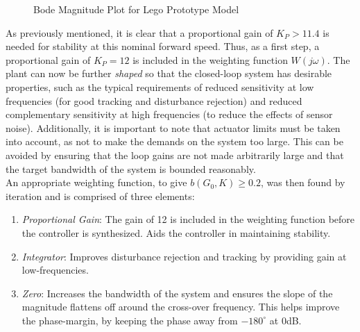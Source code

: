 \begin{figure}[H]
	\centering
	\caption{Bode Magnitude Plot for Lego Prototype Model}
	\label{fig:bodeLego}
\end{figure}

As previously mentioned, it is clear that a proportional gain of $K_P>11.4$ is needed for stability at this nominal forward speed. Thus, as a first step, a proportional gain of $K_P=12$ is included in the weighting function $W(j\omega)$. The plant can now be further \textit{shaped} so that the closed-loop system has desirable properties, such as the typical requirements of reduced sensitivity at low frequencies (for good tracking and disturbance rejection) and reduced complementary sensitivity at high frequencies (to reduce the effects of sensor noise). Additionally, it is important to note that actuator limits must be taken into account, as not to make the demands on the system too large. This can be avoided by ensuring that the loop gains are not made arbitrarily large and that the target bandwidth of the system is bounded reasonably.  \\

An appropriate weighting function, to give $b(G_0,K) \geq 0.2$, was then found by iteration and is comprised of three elements:

\begin{enumerate}
\item{\textit{Proportional Gain}: The gain of 12 is included in the weighting function before the controller is synthesized. Aids the controller in maintaining stability.}
\item{\textit{Integrator}: Improves disturbance rejection and tracking by providing gain at low-frequencies.}
\item{\textit{Zero}: Increases the bandwidth of the system and ensures the slope of the magnitude flattens off around the cross-over frequency. This helps improve the phase-margin, by keeping the phase away from $-180^{\circ}$ at 0dB.}
\end{enumerate}

